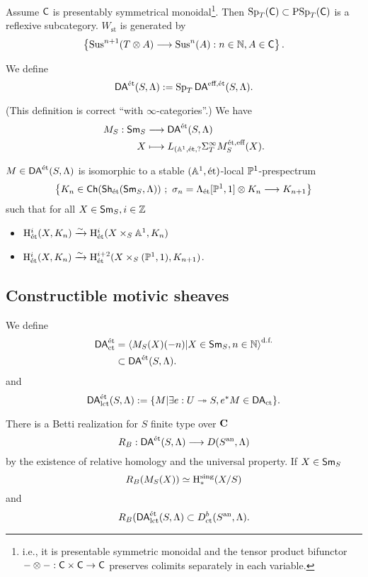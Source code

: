 \begin{proposition}
Assume $\C$ is presentably symmetrical monoidal\footnote{i.e., it is presentable
symmetric monoidal and the tensor product bifunctor $-\otimes-:\C\times\C\to\C$ preserves
colimits separately in each variable.}. Then $\Sp_T(\C)\subset \PSp_T(\C)$ is a
reflexive subcategory. $W_{\text{st}}$ is generated by
\[
\left\{ \Sus^{n+1}(T\otimes A) \to \Sus^{n}(A):n\in \N,A\in \C \right\} .
\]
\end{proposition}
\begin{definition}
We define
\[
\DAet(S,\Lambda) \defeq \Sp_T\cat{DA}^{\text{eff},\text{\'et}}(S,\Lambda).
\] 	
\end{definition}
(This definition is correct ``with $\infty$-categories''.)
We have
\begin{align*}
M_S: \Sm_S &\longrightarrow \DAet(S,\Lambda) \\
X &\longmapsto L_{(\Aff^{1},\text{\'et},?}\Sigma_T^{\infty}M_S^{\text{\'et},\text{eff}}(X)
.
\end{align*}
\begin{remark}
$M\in \DAet(S,\Lambda)$ is isomorphic to a stable $(\Aff^{1},\text{\'et})$-local $\P^1$-prespectrum
\[
\left\{K_n\in \Ch(\Sh_{\text{\'et}}(\Sm_S,\Lambda))\ ;\ \sigma_n =
\Lambda_{\text{\'et}}[\P^{1},1]\otimes K_n\to K_{n+1}\right\}
\]
such that for all $X\in \Sm_S,i \in \Z$
\begin{itemize}
\item $\CH_{\text{\'et}}^{i}(X,K_n)\simto \CH_{\text{\'et}}^{i}(X\times_S\Aff^{1},K_n)$
\item $\CH_{\text{\'et}}^{i}(X,K_n) \simto \CH_{\text{\'et}}^{i+2}(X\times_S(\P^{1},1),K_{n+1})$.
\end{itemize}
\end{remark}

\subsection{Constructible motivic sheaves}
\begin{definition}
We define  %
\begin{align*}
\DAet_{\text{ct}} &= \left<M_S(X)(-n)|X\in \Sm_S,n\in \N \right>^{\text{d.f.}} \\
&\subset \DAet(S,\Lambda).
\end{align*}
and 
\[
\DAet_{\text{lct}}(S,\Lambda) \defeq \{M|\exists e:U\surjto S, e^{*}M\in \cat{DA}_{\text{ct}}\} .
\]
\end{definition}
There is a Betti realization for $S$ finite type over $\bb{C}$
\[
R_B: \DAet(S,\Lambda) \to D(S\an,\Lambda)
\]
by the existence of relative homology and the universal property. If $X\in \Sm_S$
\[
R_B(M_S(X)) \isoto \CH_*^{\text{sing}}(X /S)
\]
and
\[
R_B(\DAet_{\text{lct}}(S,\Lambda) \subset D^{b}_{\text{ct}}(S\an,\Lambda).
\]

